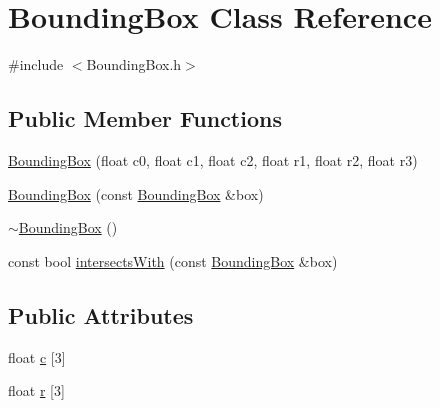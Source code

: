 \hypertarget{class_bounding_box}{\section{Bounding\-Box Class Reference}
\label{class_bounding_box}
}


{\ttfamily \#include $<$Bounding\-Box.\-h$>$}

\subsection*{Public Member Functions}
\begin{DoxyCompactItemize}
\item 
\hyperlink{class_bounding_box_a563ca028fe20bee8fcbc4aefc53aa38a}{Bounding\-Box} (float c0, float c1, float c2, float r1, float r2, float r3)
\item 
\hyperlink{class_bounding_box_af8eda3e1d297f150d0a5cf7edcb6b530}{Bounding\-Box} (const \hyperlink{class_bounding_box}{Bounding\-Box} \&box)
\item 
\hyperlink{class_bounding_box_a587de78331711c6eb6d15de867b73991}{$\sim$\-Bounding\-Box} ()
\item 
const bool \hyperlink{class_bounding_box_a8f132561bb10a3729b459f94e55ff109}{intersects\-With} (const \hyperlink{class_bounding_box}{Bounding\-Box} \&box)
\end{DoxyCompactItemize}
\subsection*{Public Attributes}
\begin{DoxyCompactItemize}
\item 
float \hyperlink{class_bounding_box_a146959bade684dc49e1c2918d9a7d737}{c} \mbox{[}3\mbox{]}
\item 
float \hyperlink{class_bounding_box_a390c79206630c8f29329d416fcbe2b31}{r} \mbox{[}3\mbox{]}
\end{DoxyCompactItemize}


